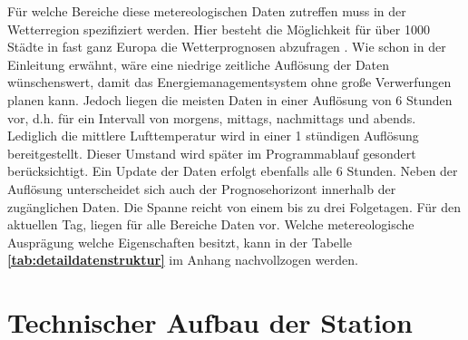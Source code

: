 Für welche Bereiche diese metereologischen Daten zutreffen muss in der Wetterregion spezifiziert werden. Hier besteht die Möglichkeit für über 1000 Städte in fast ganz Europa die Wetterprognosen abzufragen \cite[S. 27-38]{HKWDoc}. Wie schon in der Einleitung erwähnt, wäre eine niedrige zeitliche Auflösung der Daten wünschenswert, damit das Energiemanagementsystem ohne große Verwerfungen planen kann. Jedoch liegen die meisten Daten in einer Auflösung von 6 Stunden vor, d.h. für ein Intervall von morgens, mittags, nachmittags und abends. Lediglich die mittlere Lufttemperatur wird in einer 1 stündigen Auflösung bereitgestellt. Dieser Umstand wird später im Programmablauf gesondert berücksichtigt. Ein Update der Daten erfolgt ebenfalls alle 6 Stunden. Neben der Auflösung unterscheidet sich auch der Prognosehorizont innerhalb der zugänglichen Daten. Die Spanne reicht von einem bis zu drei Folgetagen. Für den aktuellen Tag, liegen für alle Bereiche Daten vor. Welche metereologische Ausprägung welche Eigenschaften besitzt, kann in der Tabelle \textbf{\ref{tab:detaildatenstruktur}} im Anhang nachvollzogen werden.    
\section{Technischer Aufbau der Station}
